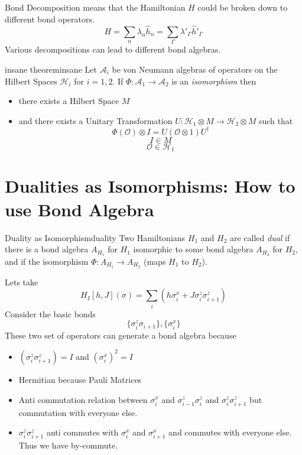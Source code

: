 \documentclass[12pt]{article}        %
\begin{document}
Bond Decomposition means that the Hamiltonian $H$ could be broken down to different bond operators. 
\[
H = \sum_{n}^{} \lambda_n \hat{h}_n = \sum_{\Gamma}^{} \lambda'_\Gamma \hat{h}'_\Gamma
\] 
Various decompositions can lead to different bond algebras. 

\begin{theorem}
	{insane theorem}{insane}
	Let $\mathcal A_i$ be von Neumann algebras of operators on the Hilbert Spaces $\mathcal H_i$ for $i = 1,2$. If $\Phi : \mathcal A_1 \to  \mathcal A_2$ is an \emph{isomorphism} then 
	\begin{itemize}
		\item there exists a Hilbert Space $M$ 
		\item and there exists a Unitary Transformation $U : \mathcal H_1 \otimes M \to  \mathcal H_2 \otimes M$ such that
			\[
			\Phi(\mathcal O) \otimes I = 
			U \left(\mathcal O \otimes 1 \right) U ^{\dagger}
			\]
			\[
			I \in M
			\] 
			\[
			\mathcal O \in \mathcal H_1
			\] 
	\end{itemize}
\end{theorem}


\section{Dualities as Isomorphisms: How to use Bond Algebra}
\begin{definition}
	{Duality as Isomorphism}{duality}
	Two Hamiltonians $H_1$ and $H_2$ are called \emph{dual} if there is a bond algebra $A_{H_1}$ for $H_1$ isomorphic to some bond algebra $A_{H_2}$ for $H_2$, and if the isomorphism $\Phi : A_{H_1} \to A_{H_2}$ (maps $H_1$ to $H_2$). 
\end{definition}

Lets take 
\[
	H_I [h,J] (\sigma) = \sum_i (h \sigma_i ^{x} + J \sigma_i ^{z} \sigma_{i+1} ^{z}) 
\]
Consider the basic bonds
\[
	\{\sigma_i ^{z} \sigma_{i+1} \} , \{\sigma_i^{x}\} 
\] 
These two set of operators can generate a bond algebra because 
\begin{itemize}
	\item $(\sigma_i ^{z} \sigma_{i+1}^{z}) = I$ and $(\sigma_i^{x}) ^2 = I$
	\item Hermitian because Pauli Matrices
	\item Anti commutation relation between $\sigma_i^{x}$ and $\sigma_{i-1}^{z} \sigma_i^{z}$ and $\sigma_{i}^{z} \sigma_{i+1}^{z}$ but commutation with everyone else.
	\item $\sigma_i^{z} \sigma_{i+1}^{z}$ anti commutes with $\sigma_i^{x} $ and $\sigma_{i+1}^{x}$ and commutes with everyone else. Thus we have by-commute. 
\end{itemize}
\end{document}
